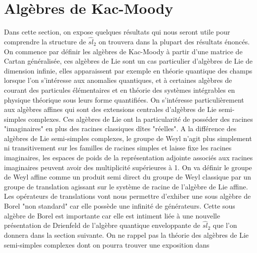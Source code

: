 \documentclass[12pt]{article}
\theoremstyle{definition}
\begin{document}
\section{Algèbres de Kac-Moody}
Dans cette section, on expose quelques résultats qui nous seront utile pour comprendre la structure de $\widehat{sl}_2$ on trouvera dans \cite{Kac} la plupart des résultats énoncés. On commence par définir les algèbres de Kac-Moody à partir d'une matrice de Cartan généralisée, ces algèbres de Lie sont un cas particulier d'algèbres de Lie de dimension infinie, elles apparaissent par exemple en théorie quantique des champs lorsque l'on s'intéresse aux anomalies quantiques, et à certaines algèbres de courant des particules élémentaires et en théorie des systèmes intégrables en physique théorique sous leurs forme quantifiées. On s'intéresse particulièrement aux algèbres affines qui sont des extensions centrales d'algèbres de Lie semi-simples complexes. Ces algèbres de Lie ont la particularité de posséder des racines "imaginaires" en plus des racines classiques dîtes "réelles". A la différence des algèbres de Lie semi-simples complexes, le groupe de Weyl n'agit plus simplement ni transitivement sur les familles de racines simples et laisse fixe les racines imaginaires, les espaces de poids de la représentation adjointe associés aux racines imaginaires peuvent avoir des multiplicité supérieures à 1. On va définir le groupe de Weyl affine comme un produit semi direct du groupe de Weyl classique par un groupe de translation agissant sur le système de racine de l'algèbre de Lie affine. Les opérateurs de translations vont nous permettre d'exhiber une sous algèbre de Borel "non standard" car elle possède une infinité de générateurs. Cette sous algèbre de Borel est importante car elle est intiment liée à une nouvelle présentation de Drienfeld de l'algèbre quantique enveloppante de  $\widehat{sl}_2$ que l'on donnera dans la section suivante. On ne rappel pas la théorie des algèbres de Lie semi-simples complexes dont on pourra trouver une exposition dans \cite{Ser}
\end{document}
